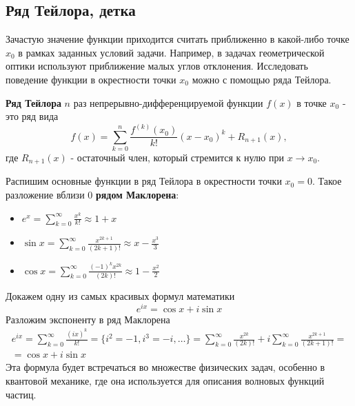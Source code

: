 \subsection{Ряд Тейлора, детка}
Зачастую значение функции приходится считать приближенно в какой-либо точке $x_0$ в рамках заданных условий задачи. Например, в задачах геометрической оптики используют приближение малых углов отклонения. Исследовать поведение функции в окрестности точки $x_0$ можно с помощью ряда Тейлора.
\begin{definition}
    \textbf{Ряд Тейлора} $n$ раз непрерывно-дифференцируемой функции $f(x)$ в точке $x_0$ - это ряд вида
    \begin{equation*}
        f(x) = \sum_{k = 0}^{n}\frac{f^{(k)}(x_0)}{k!} (x - x_0)^k + R_{n+1}(x),
    \end{equation*}
    где $R_{n+1}(x)$ - остаточный член, который стремится к нулю при $x \to x_0$.
\end{definition}

Распишим основные функции в ряд Тейлора в окрестности точки $x_0 = 0$. Такое разложение вблизи $0$ \textbf{рядом Маклорена}:
\begin{itemize}
    \item $e^{x} = \sum_{k = 0}^{\infty} \frac{x^k}{k!} \approx 1 + x$
    \item $\sin x = \sum_{k = 0}^{\infty} \frac{x^{2k + 1}}{(2k + 1)!} \approx x - \frac{x^3}{3}$
    \item $\cos x = \sum_{k = 0}^{\infty} \frac{(-1)^k x^{2k}}{(2k)!} \approx 1 - \frac{x^2}{2}$
\end{itemize}

\begin{example}
    Докажем одну из самых красивых формул математики
    \begin{equation*}
        e^{ix} = \cos x + i \sin x
    \end{equation*}
    Разложим экспоненту в ряд Маклорена
    \begin{multline*}
        e^{ix} = \sum_{k = 0}^{\infty} \frac{(ix)^k}{k!} = \{i^2 = -1, i^3 = -i, \dots \}= \sum_{k = 0}^{\infty} \frac{x^{2k}}{(2k)!} + i \sum_{k = 0}^{\infty} \frac{x^{2k + 1}}{(2k + 1)!} = \\
        = \cos x + i \sin x
    \end{multline*}
    Эта формула будет встречаться во множестве физических задач, особенно в квантовой механике, где она используется для описания волновых функций частиц.
\end{example}